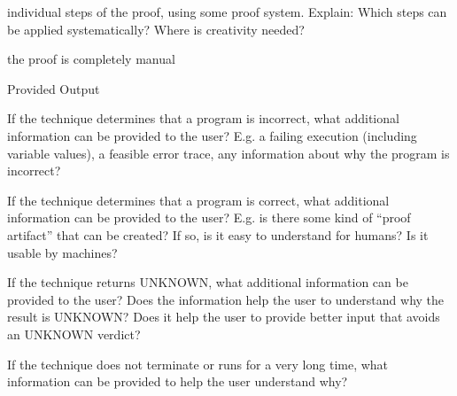 \documentclass[a4paper]{article}
\begin{document}
\begin{minipage}[t]{0.16\linewidth}
\begin{betterlist}
\begin{betterlist}
			\item \checkboxUnchecked individual steps of the proof, using some proof system. Explain: Which steps can be applied systematically? Where is creativity needed?

			\item \checkboxUnchecked the proof is completely manual
		\end{betterlist}
		\item \alert{Provided Output}
		\begin{betterlist}
			\item If the technique determines that a program is incorrect, what additional information can be provided to the user? E.g. a failing execution (including variable values), a feasible error trace, any information about why the program is incorrect?

			\item If the technique determines that a program is correct, what additional information can be provided to the user? E.g. is there some kind of \enquote{proof artifact} that can be created? If so, is it easy to understand for humans? Is it usable by machines?

			\item If the technique returns UNKNOWN, what additional information can be provided to the user? Does the information help the user to understand why the result is UNKNOWN? Does it help the user to provide better input that avoids an UNKNOWN verdict?

			\item If the technique does not terminate or runs for a very long time, what information can be provided to help the user understand why?


\end{betterlist}
\end{betterlist}
\end{minipage}
\end{document}
